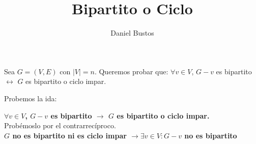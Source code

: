 \documentclass{article}
\title{Bipartito o Ciclo}
\author{Daniel Bustos}
\begin{document}
\maketitle

Sea $G = (V,E)$ con $|V| = n$. Queremos probar que: $\forall v \in V$, $G-v$ es bipartito $\leftrightarrow$ $G$ es bipartito o ciclo impar.

Probemos la ida:

\textbf{$\forall v \in V$, $G-v$ es bipartito $\rightarrow$ $G$ es bipartito o ciclo impar.}\\ 

Probémoslo por el contrarrecíproco.\\
\textbf{$G$  no es bipartito ni es ciclo impar $\rightarrow \exists v \in V: G-v $ no es bipartito}\\\\
\end{document}
